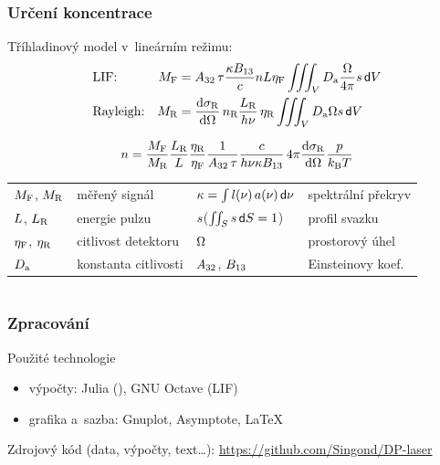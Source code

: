 \documentclass[10pt]{beamer}
\renewcommand\dd[1]{\,\mathsf{d}#1}
\begin{document}
\begin{frame}
	\frametitle{Určení koncentrace}
	Tříhladinový model v~lineárním režimu:
	\begin{align*}
		&\text{LIF:} &
		\lifsignal &= \einsteina32\,\lifetime
		\frac{\specoverlap \einsteinb13}{\lightspeed}
		\ndens \enlaser \lifeff
		\iiint_\vol \sensabs \frac{\solidangle}{4\pi} \beamprofile \dd{\vol} \\
		&\text{Rayleigh:} &
		\rayleighsignal &= \rayleighdxsect \, \rayleighndens
		\frac{\enlaserrayleigh}{\planck\freq} \, \rayleigheff
		\iiint_\vol \sensabs \solidangle \beamprofile \dd{\vol}
	\end{align*}
	\vspace{-3ex}
	\begin{block}{\vspace*{-2ex}}
		\begin{equation*}
			n = \frac{M_\text{F}}{M_\text{R}}
			\frac{L_\text{R}}{L}\frac{\eta_\text{R}}{\eta_\text{F}}
			\frac{1}{A_{32}\,\tau}
			\frac{c}{h\nu\kappa B_{13}}
			\, 4\pi \frac{\text{d}\sigma_\text{R}}{\text{d}\Omega} \frac{p}{k_\text{B}T}
		\end{equation*}
	\end{block}
	\medskip
	\small
	\centering
	\begin{tabular}{l l l l}
		$M_\text{F}$, $M_\text{R}$ & měřený signál &
		$\specoverlap = \int l(\freq)\,a(\freq) \dd{\freq}$
			& spektrální překryv \\
		$L$, $L_\text{R}$ & energie pulzu &
		$s$\quad($\iint_S \beamprofile \dd S = 1$) & profil svazku \\
		$\eta_\text{F}$, $\eta_\text{R}$ & citlivost detektoru &
		$\Omega$ & prostorový úhel \\
		$D_\text{a}$ & konstanta citlivosti &
		$A_{32}$, $B_{13}$ & Einsteinovy koef. \\
	\end{tabular}
\end{frame}

\section*{}

\begin{frame}
	\frametitle{Zpracování}
	Použité technologie
	\begin{itemize}
		\item výpočty: Julia (\EFISH), GNU Octave (LIF)
		\item grafika a~sazba: Gnuplot, Asymptote, \LaTeX
	\end{itemize}
	\medskip
	Zdrojový kód (data, výpočty, text\ldots):
	\url{https://github.com/Singond/DP-laser}
\end{frame}
\end{document}
